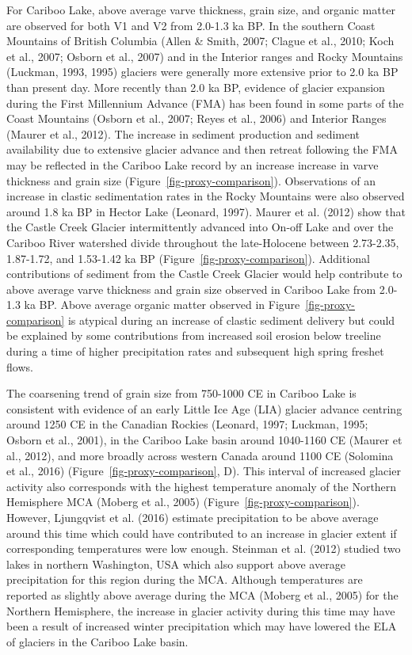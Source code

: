 \documentclass[
  letterpaper,
  DIV=11,
  numbers=noendperiod]{scrartcl}
\begin{document}
For Cariboo Lake, above average varve thickness, grain size, and organic
matter are observed for both V1 and V2 from 2.0-1.3 ka BP. In the
southern Coast Mountains of British Columbia (Allen \& Smith, 2007;
Clague et al., 2010; Koch et al., 2007; Osborn et al., 2007) and in the
Interior ranges and Rocky Mountains (Luckman, 1993, 1995) glaciers were
generally more extensive prior to 2.0 ka BP than present day. More
recently than 2.0 ka BP, evidence of glacier expansion during the First
Millennium Advance (FMA) has been found in some parts of the Coast
Mountains (Osborn et al., 2007; Reyes et al., 2006) and Interior Ranges
(Maurer et al., 2012). The increase in sediment production and sediment
availability due to extensive glacier advance and then retreat following
the FMA may be reflected in the Cariboo Lake record by an increase
increase in varve thickness and grain size
(Figure~\ref{fig-proxy-comparison}). Observations of an increase in
clastic sedimentation rates in the Rocky Mountains were also observed
around 1.8 ka BP in Hector Lake (Leonard, 1997). Maurer et al. (2012)
show that the Castle Creek Glacier intermittently advanced into On-off
Lake and over the Cariboo River watershed divide throughout the
late-Holocene between 2.73-2.35, 1.87-1.72, and 1.53-1.42 ka BP
(Figure~\ref{fig-proxy-comparison}). Additional contributions of
sediment from the Castle Creek Glacier would help contribute to above
average varve thickness and grain size observed in Cariboo Lake from
2.0-1.3 ka BP. Above average organic matter observed in
Figure~\ref{fig-proxy-comparison} is atypical during an increase of
clastic sediment delivery but could be explained by some contributions
from increased soil erosion below treeline during a time of higher
precipitation rates and subsequent high spring freshet flows.

The coarsening trend of grain size from 750-1000 CE in Cariboo Lake is
consistent with evidence of an early Little Ice Age (LIA) glacier
advance centring around 1250 CE in the Canadian Rockies (Leonard, 1997;
Luckman, 1995; Osborn et al., 2001), in the Cariboo Lake basin around
1040-1160 CE (Maurer et al., 2012), and more broadly across western
Canada around 1100 CE (Solomina et al., 2016)
(Figure~\ref{fig-proxy-comparison}, D). This interval of increased
glacier activity also corresponds with the highest temperature anomaly
of the Northern Hemisphere MCA (Moberg et al., 2005)
(Figure~\ref{fig-proxy-comparison}). However, Ljungqvist et al. (2016)
estimate precipitation to be above average around this time which could
have contributed to an increase in glacier extent if corresponding
temperatures were low enough. Steinman et al. (2012) studied two lakes
in northern Washington, USA which also support above average
precipitation for this region during the MCA. Although temperatures are
reported as slightly above average during the MCA (Moberg et al., 2005)
for the Northern Hemisphere, the increase in glacier activity during
this time may have been a result of increased winter precipitation which
may have lowered the ELA of glaciers in the Cariboo Lake basin.
\end{document}
